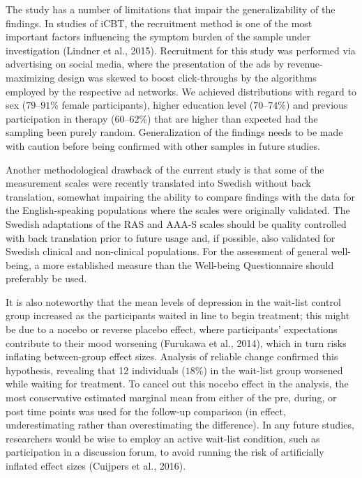 \documentclass[preprint,
3p]{elsarticle} %
\begin{document}
The study has a number of limitations that impair the generalizability
of the findings. In studies of iCBT, the recruitment method is one of
the most important factors influencing the symptom burden of the sample
under investigation (Lindner et al., 2015). Recruitment for this study
was performed via advertising on social media, where the presentation of
the ads by revenue-maximizing design was skewed to boost click-throughs
by the algorithms employed by the respective ad networks. We achieved
distributions with regard to sex (\(79\)--\(91\)\% female participants),
higher education level (\(70\)--\(74\)\%) and previous participation in
therapy (\(60\)--\(62\)\%) that are higher than expected had the
sampling been purely random. Generalization of the findings needs to be
made with caution before being confirmed with other samples in future
studies.

Another methodological drawback of the current study is that some of the
measurement scales were recently translated into Swedish without back
translation, somewhat impairing the ability to compare findings with the
data for the English-speaking populations where the scales were
originally validated. The Swedish adaptations of the RAS and AAA-S
scales should be quality controlled with back translation prior to
future usage and, if possible, also validated for Swedish clinical and
non-clinical populations. For the assessment of general well-being, a
more established measure than the Well-being Questionnaire should
preferably be used.

It is also noteworthy that the mean levels of depression in the
wait-list control group increased as the participants waited in line to
begin treatment; this might be due to a nocebo or reverse placebo
effect, where participants' expectations contribute to their mood
worsening (Furukawa et al., 2014), which in turn risks inflating
between-group effect sizes. Analysis of reliable change confirmed this
hypothesis, revealing that 12 individuals (\(18\)\%) in the wait-list
group worsened while waiting for treatment. To cancel out this nocebo
effect in the analysis, the most conservative estimated marginal mean
from either of the pre, during, or post time points was used for the
follow-up comparison (in effect, underestimating rather than
overestimating the difference). In any future studies, researchers would
be wise to employ an active wait-list condition, such as participation
in a discussion forum, to avoid running the risk of artificially
inflated effect sizes (Cuijpers et al., 2016).
\end{document}
